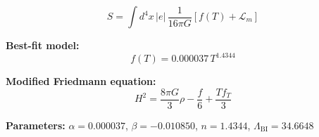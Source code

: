
\begin{equation}
  S = \int d^4x \, |e| \, \frac{1}{16\pi G} \left[ f(T) + \mathcal{L}_m \right]
\end{equation}

\textbf{Best-fit model:}
\begin{equation}
  f(T) = 0.000037 \, T^{1.4344}
\end{equation}

\textbf{Modified Friedmann equation:}
\begin{equation}
  H^2 = \frac{8\pi G}{3} \rho - \frac{f}{6} + \frac{T f_T}{3}
\end{equation}

\textbf{Parameters:}
$\alpha = 0.000037$, \quad
$\beta = -0.010850$, \quad
$n = 1.4344$, \quad
$\Lambda_{\text{BI}} = 34.6648$